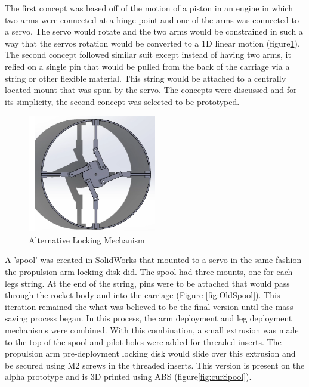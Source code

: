 The first concept was based off of the motion of a piston in an engine in which two arms were connected at a hinge point and one of the arms was connected to a servo. The servo would rotate and the two arms would be constrained in such a way that the servos rotation would be converted to a 1D linear motion (figure\ref{fig:ALM}). The second concept followed similar suit except instead of having two arms, it relied on a single pin that would be pulled from the back of the carriage via a string or other flexible material. This string would be attached to a centrally located mount that was spun by the servo. The concepts were discussed and for its simplicity, the second concept was selected to be prototyped. 

\begin{figure}[H]
    \centering
    \includegraphics[width=0.5\textwidth]{src/figs/DavidPin.png}
    \caption{Alternative Locking Mechanism}
    \label{fig:ALM}
\end{figure}

A 'spool' was created in SolidWorks that mounted to a servo in the same fashion the propulsion arm locking disk did. The spool had three mounts, one for each legs string. At the end of the string, pins were to be attached that would pass through the rocket body and into the carriage (Figure \ref{fig:OldSpool}). This iteration remained the what was believed to be the final version until the mass saving process began. In this process, the arm deployment and leg deployment mechanisms were combined. With this combination, a small extrusion was made to the top of the spool and pilot holes were added for threaded inserts. The propulsion arm pre-deployment locking disk would slide over this extrusion and be secured using M2 screws in the threaded inserts. This version is present on the alpha prototype and is 3D printed using ABS (figure\ref{fig:curSpool}). 

